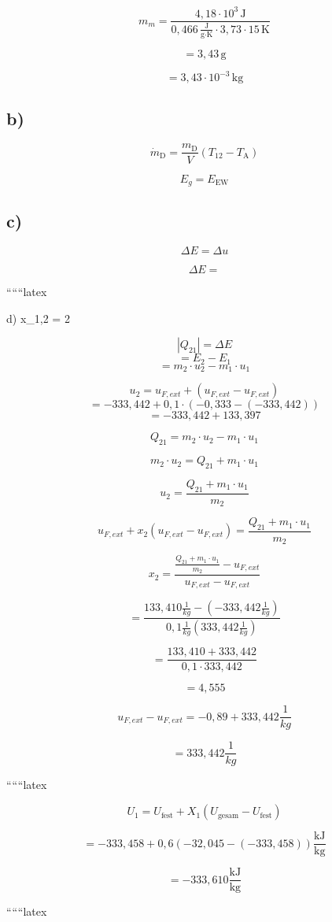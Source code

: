 \[
m_m = \frac{4,18 \cdot 10^3 \, \text{J}}{0,466 \, \frac{\text{J}}{\text{g} \cdot \text{K}} \cdot 3,73 \cdot 15 \, \text{K}}
\]

\[
= 3,43 \, \text{g}
\]

\[
= 3,43 \cdot 10^{-3} \, \text{kg}
\]

\subsection*{b)}

\[
\dot{m}_{\text{D}} = \frac{m_{\text{D}}}{V} \left( T_{12} - T_{\text{A}} \right)
\]

\[
E_g = E_{\text{EW}}
\]

\subsection*{c)}

\[
\Delta E = \Delta u
\]

\[
\Delta E =
\]

``````latex


d) \quad x_{1,2} = 2

\[
|Q_{21}| = \Delta E
\]
\[
= E_2 - E_1
\]
\[
= m_2 \cdot u_2 - m_1 \cdot u_1
\]

\[
u_2 = u_{F, ext} + \left( u_{F, ext} - u_{F, ext} \right)
\]
\[
= -333,442 + 0,1 \cdot (-0,333 - (-333,442))
\]
\[
= -333,442 + 133,397
\]

\[
Q_{21} = m_2 \cdot u_2 - m_1 \cdot u_1
\]

\[
m_2 \cdot u_2 = Q_{21} + m_1 \cdot u_1
\]

\[
u_2 = \frac{Q_{21} + m_1 \cdot u_1}{m_2}
\]

\[
u_{F, ext} + x_2 \left( u_{F, ext} - u_{F, ext} \right) = \frac{Q_{21} + m_1 \cdot u_1}{m_2}
\]

\[
x_2 = \frac{\frac{Q_{21} + m_1 \cdot u_1}{m_2} - u_{F, ext}}{u_{F, ext} - u_{F, ext}}
\]

\[
= \frac{133,410 \frac{1}{kg} - (-333,442 \frac{1}{kg})}{0,1 \frac{1}{kg} (333,442 \frac{1}{kg})}
\]

\[
= \frac{133,410 + 333,442}{0,1 \cdot 333,442}
\]

\[
= 4,555
\]

\[
u_{F, ext} - u_{F, ext} = -0,89 + 333,442 \frac{1}{kg}
\]

\[
= 333,442 \frac{1}{kg}
\]

``````latex


\[
U_1 = U_{\text{fest}} + X_1 \left( U_{\text{gesam}} - U_{\text{fest}} \right)
\]

\[
= -333,458 + 0,6 \left( -32,045 - (-333,458) \right) \frac{\text{kJ}}{\text{kg}}
\]

\[
= -333,610 \frac{\text{kJ}}{\text{kg}}
\]

``````latex


